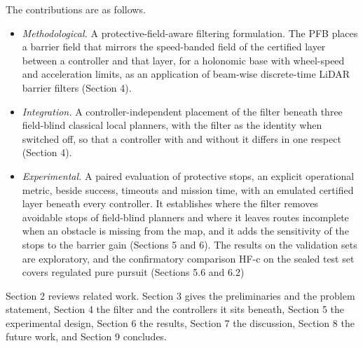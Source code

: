 The contributions are as follows.

\begin{itemize}
\item \emph{Methodological.} A protective-field-aware filtering formulation. The PFB places a barrier field that mirrors the speed-banded field of the certified layer between a controller and that layer, for a holonomic base with wheel-speed and acceleration limits, as an application of beam-wise discrete-time LiDAR barrier filters (Section 4).
\item \emph{Integration.} A controller-independent placement of the filter beneath three field-blind classical local planners, with the filter as the identity when switched off, so that a controller with and without it differs in one respect (Section 4).
\item \emph{Experimental.} A paired evaluation of protective stops, an explicit operational metric, beside success, timeouts and mission time, with an emulated certified layer beneath every controller. It establishes where the filter removes avoidable stops of field-blind planners and where it leaves routes incomplete when an obstacle is missing from the map, and it adds the sensitivity of the stops to the barrier gain (Sections 5 and 6). The results on the validation sets are exploratory, and the confirmatory comparison HF-c on the sealed test set covers regulated pure pursuit (Sections 5.6 and 6.2) 
\end{itemize}

Section 2 reviews related work. Section 3 gives the preliminaries and the problem statement, Section 4 the filter and the controllers it sits beneath, Section 5 the experimental design, Section 6 the results, Section 7 the discussion, Section 8 the future work, and Section 9 concludes.

